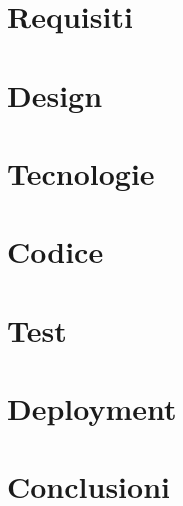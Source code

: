\documentclass[a4paper]{report}
\begin{document}
\pagebreak

\chapter{Requisiti}

\chapter{Design}

\chapter{Tecnologie}

\chapter{Codice}

\chapter{Test}

\chapter{Deployment}

\chapter{Conclusioni}
\end{document}
